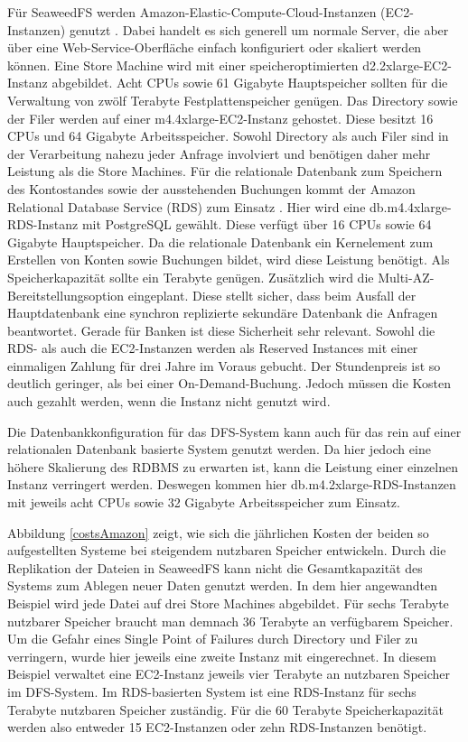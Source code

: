 \documentclass[12pt,oneside,a4paper,parskip]{scrbook}
\begin{document}
Für SeaweedFS werden Amazon-Elastic-Compute-Cloud-Instanzen (EC2-Instanzen) genutzt \cite{EC2}. Dabei handelt es sich generell um normale Server, die aber über eine Web-Service-Oberfläche einfach konfiguriert oder skaliert werden können. Eine Store Machine wird mit einer speicheroptimierten d2.2xlarge-EC2-Instanz abgebildet. Acht CPUs sowie 61 Gigabyte Hauptspeicher sollten für die Verwaltung von zwölf Terabyte Festplattenspeicher genügen. Das Directory sowie der Filer werden auf einer m4.4xlarge-EC2-Instanz gehostet. Diese besitzt 16 CPUs und 64 Gigabyte Arbeitsspeicher. Sowohl Directory als auch Filer sind in der Verarbeitung nahezu jeder Anfrage involviert und benötigen daher mehr Leistung als die Store Machines. Für die relationale Datenbank zum Speichern des Kontostandes sowie der ausstehenden Buchungen kommt der Amazon Relational Database Service (RDS) zum Einsatz \cite{RDS}. Hier wird eine db.m4.4xlarge-RDS-Instanz mit PostgreSQL gewählt. Diese verfügt über 16 CPUs sowie 64 Gigabyte Hauptspeicher. Da die relationale Datenbank ein Kernelement zum Erstellen von Konten sowie Buchungen bildet, wird diese Leistung benötigt. Als Speicherkapazität sollte ein Terabyte genügen. Zusätzlich wird die Multi-AZ-Bereitstellungsoption eingeplant. Diese stellt sicher, dass beim Ausfall der Hauptdatenbank eine synchron replizierte sekundäre Datenbank die Anfragen beantwortet. Gerade für Banken ist diese Sicherheit sehr relevant.
Sowohl die RDS- als auch die EC2-Instanzen werden als Reserved Instances mit einer einmaligen Zahlung für drei Jahre im Voraus gebucht. Der Stundenpreis ist so deutlich geringer, als bei einer On-Demand-Buchung. Jedoch müssen die Kosten auch gezahlt werden, wenn die Instanz nicht genutzt wird.

Die Datenbankkonfiguration für das DFS-System kann auch für das rein auf einer relationalen Datenbank basierte System genutzt werden. Da hier jedoch eine höhere Skalierung des RDBMS zu erwarten ist, kann die Leistung einer einzelnen Instanz verringert werden. Deswegen kommen hier db.m4.2xlarge-RDS-Instanzen mit jeweils acht CPUs sowie 32 Gigabyte Arbeitsspeicher zum Einsatz. 


Abbildung \ref{costsAmazon} zeigt, wie sich die jährlichen Kosten der beiden so aufgestellten Systeme bei steigendem nutzbaren Speicher entwickeln. Durch die Replikation der Dateien in SeaweedFS kann nicht die Gesamtkapazität des Systems zum Ablegen neuer Daten genutzt werden. In dem hier angewandten Beispiel wird jede Datei auf drei Store Machines abgebildet. Für sechs Terabyte nutzbarer Speicher braucht man demnach 36 Terabyte an verfügbarem Speicher. Um die Gefahr eines Single Point of Failures durch Directory und Filer zu verringern, wurde hier jeweils eine zweite Instanz mit eingerechnet. In diesem Beispiel verwaltet eine EC2-Instanz jeweils vier Terabyte an nutzbaren Speicher im DFS-System. Im RDS-basierten System ist eine RDS-Instanz für sechs Terabyte nutzbaren Speicher zuständig. Für die 60 Terabyte Speicherkapazität werden also entweder 15 EC2-Instanzen oder zehn RDS-Instanzen benötigt. 
\end{document}
